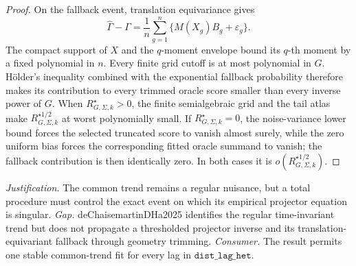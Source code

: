 \documentclass{article}
\begin{document}
\begin{proof}
On the fallback event, translation equivariance gives
\[
\widehat\Gamma-\Gamma
=\frac1n\sum_{g=1}^n\{M(X_g)B_g+\varepsilon_g\}.
\]
The compact support of \(X\) and the \(q\)-moment envelope bound its \(q\)-th moment by a fixed polynomial in \(n\). Every finite grid cutoff is at most polynomial in \(G\). Hölder's inequality combined with the exponential fallback probability therefore makes its contribution to every trimmed oracle score smaller than every inverse power of \(G\). When \(R_{G,\Sigma,k}^{\star}>0\), the finite semialgebraic grid and the tail atlas make \(R_{G,\Sigma,k}^{\star 1/2}\) at worst polynomially small. If \(R_{G,\Sigma,k}^{\star}=0\), the noise-variance lower bound forces the selected truncated score to vanish almost surely, while the zero uniform bias forces the corresponding fitted oracle summand to vanish; the fallback contribution is then identically zero. In both cases it is \(o(R_{G,\Sigma,k}^{\star 1/2})\).
\end{proof}
\par\smallskip\noindent \textit{Justification.} The common trend remains a regular nuisance, but a total procedure must control the exact event on which its empirical projector equation is singular. \textit{Gap.} deChaisemartinDHa2025 identifies the regular time-invariant trend but does not propagate a thresholded projector inverse and its translation-equivariant fallback through geometry trimming. \textit{Consumer.} The result permits one stable common-trend fit for every lag in \(\texttt{dist\_lag\_het}\).
\end{document}
